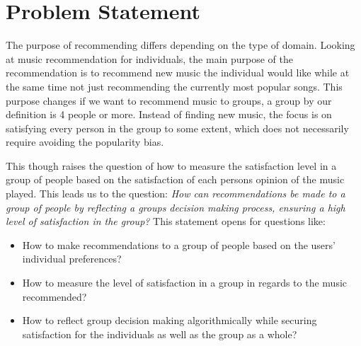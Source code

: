 	\section{Problem Statement}
The purpose of recommending differs depending on the type of domain. Looking at music recommendation for individuals, the main purpose of the recommendation is to recommend new music the individual would like while at the same time not just recommending the currently most popular songs. This purpose changes if we want to recommend music to groups, a group by our definition is 4 people or more. Instead of finding new music, the focus is on satisfying every person in the group to some extent, which does not necessarily require avoiding the popularity bias. 

This though raises the question of how to measure the satisfaction level in a group of people based on the satisfaction of each persons opinion of the music played. This leads us to the question:
\textit{How can recommendations be made to a group of people by reflecting a groups decision making process, ensuring a high level of satisfaction in the group?} This statement opens for questions like:
\begin{itemize}
\item How to make recommendations to a group of people based on the users' individual preferences?
\item How to measure the level of satisfaction in a group in regards to the music recommended?
\item How to reflect group decision making algorithmically while securing satisfaction for the individuals as well as the group as a whole?
\end{itemize}